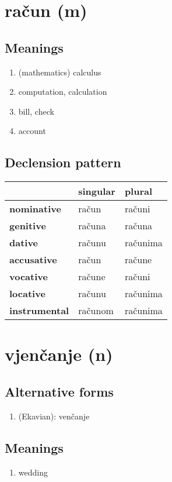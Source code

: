 \filbreak
\section{račun (m)}
\subsection*{Meanings}
\begin{enumerate}
\item (mathematics) calculus
\item computation, calculation
\item bill, check
\item account
\end{enumerate}
\subsection*{Declension pattern}
\begin{tabularx}{\linewidth}{Xll}
\toprule
{} & singular &    plural \\
\midrule
\textbf{nominative  } &    račun &    računi \\
\textbf{genitive    } &   računa &    računa \\
\textbf{dative      } &   računu &  računima \\
\textbf{accusative  } &    račun &    račune \\
\textbf{vocative    } &   račune &    računi \\
\textbf{locative    } &   računu &  računima \\
\textbf{instrumental} &  računom &  računima \\
\bottomrule
\end{tabularx}

\filbreak
\section{vjenčanje (n)}
\subsection*{Alternative forms}
\begin{enumerate}
\item (Ekavian): venčanje
\end{enumerate}
\subsection*{Meanings}
\begin{enumerate}
\item wedding
\end{enumerate}
